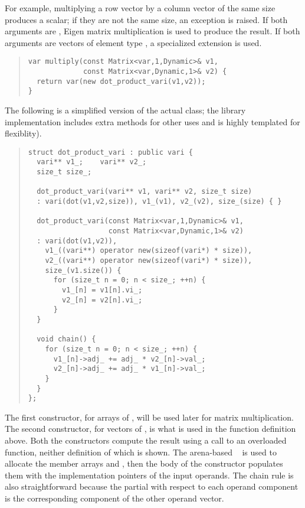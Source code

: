 \documentclass[10pt]{article}
\begin{document}
For example, multiplying a row vector by a column vector of the same
size produces a scalar; if they are not the same size, an exception is
raised.  If both arguments are , Eigen matrix
multiplication is used to produce the result.  If both arguments are
vectors of element type , a specialized 
extension is used.
%
\begin{quote}
\begin{Verbatim}
var multiply(const Matrix<var,1,Dynamic>& v1,
             const Matrix<var,Dynamic,1>& v2) {
  return var(new dot_product_vari(v1,v2));
}
\end{Verbatim}
\end{quote}
%
The following is a simplified version of the actual
 class; the library implementation includes
extra methods for other uses and is highly templated for flexiblity).
%
\begin{quote}
\begin{Verbatim}
struct dot_product_vari : public vari {
  vari** v1_;    vari** v2_;
  size_t size_;
  
  dot_product_vari(vari** v1, vari** v2, size_t size) 
  : vari(dot(v1,v2,size)), v1_(v1), v2_(v2), size_(size) { }

  dot_product_vari(const Matrix<var,1,Dynamic>& v1,
                   const Matrix<var,Dynamic,1>& v2)
  : vari(dot(v1,v2)),
    v1_((vari**) operator new(sizeof(vari*) * size)),
    v2_((vari**) operator new(sizeof(vari*) * size)),
    size_(v1.size()) {
      for (size_t n = 0; n < size_; ++n) {
        v1_[n] = v1[n].vi_;  
        v2_[n] = v2[n].vi_;
      }
  }

  void chain() {
    for (size_t n = 0; n < size_; ++n) {
      v1_[n]->adj_ += adj_ * v2_[n]->val_;
      v2_[n]->adj_ += adj_ * v1_[n]->val_;
    }
  }
};
\end{Verbatim}
\end{quote}
%
The first constructor, for arrays of , will be used later
for matrix multiplication.  The second constructor, for vectors of
, is what is used in the function definition above.  Both
the constructors compute the result using a call to an overloaded
function, neither definition of which is shown.  The arena-based
~ is used to allocate the member arrays
 and , then the body of the constructor
populates them with the implementation pointers of the input operands.
The chain rule is also straightforward because the partial with
respect to each operand component is the corresponding component of
the other operand vector.
\end{document}
